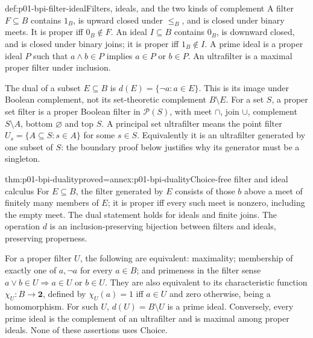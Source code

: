 \begin{hbdefinition}{def:p01-bpi-filter-ideal}{Filters, ideals, and the two kinds of complement}
A filter \(F\subseteq B\) contains \(1_B\), is upward closed under
\(\leq_B\), and is closed under binary meets. It is proper iff
\(0_B\notin F\). An ideal \(I\subseteq B\) contains \(0_B\), is
downward closed, and is closed under binary joins; it is proper iff
\(1_B\notin I\). A prime ideal is a proper ideal \(P\) such that
\(a\wedge b\in P\) implies \(a\in P\) or \(b\in P\).
An ultrafilter is a maximal proper filter under inclusion.

The dual of a subset \(E\subseteq B\) is
\(d(E)=\{\neg a:a\in E\}\). This is its image under Boolean
complement, not its set-theoretic complement \(B\setminus E\).
For a set \(S\), a proper set filter is a proper Boolean filter in
\(\mathcal P(S)\), with meet \(\cap\), join \(\cup\), complement
\(S\setminus A\), bottom \(\varnothing\) and top \(S\).
A principal set ultrafilter means the point filter
\(U_s=\{A\subseteq S:s\in A\}\) for some \(s\in S\).
Equivalently it is an ultrafilter generated by one subset of \(S\):
the boundary proof below justifies why its generator must be a singleton.
\end{hbdefinition}

\begin{hblemma}{thm:p01-bpi-duality}{proved=annex:p01-bpi-duality}{Choice-free filter and ideal calculus}
For \(E\subseteq B\), the filter generated by \(E\) consists of those
\(b\) above a meet of finitely many members of \(E\); it is proper iff
every such meet is nonzero, including the empty meet. The dual statement
holds for ideals and finite joins. The operation \(d\) is an
inclusion-preserving bijection between filters and ideals, preserving
properness.

For a proper filter \(U\), the following are equivalent: maximality;
membership of exactly one of \(a,\neg a\) for every \(a\in B\);
and primeness in the filter sense
\(a\vee b\in U\Rightarrow a\in U\text{ or }b\in U\).
They are also equivalent to its characteristic function
\(\chi_U:B\to\mathbf2\), defined by \(\chi_U(a)=1\) iff
\(a\in U\) and zero otherwise, being a homomorphism.
For such \(U\), \(d(U)=B\setminus U\) is a prime ideal.
Conversely, every prime ideal is the complement of an ultrafilter and is
maximal among proper ideals. None of these assertions uses Choice.
\end{hblemma}

